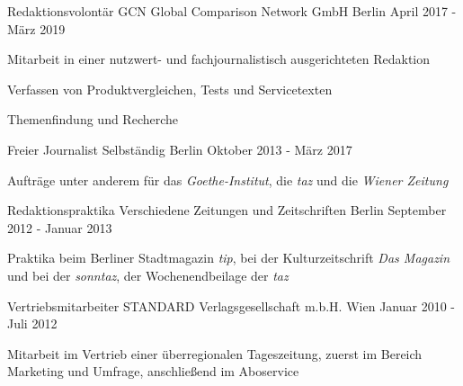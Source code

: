 \begin{cventries}
  \cventry
    {Redaktionsvolontär} %
    {GCN Global Comparison Network GmbH} %
    {Berlin} %
    {April 2017 - März 2019} %
    {
      \begin{cvitems} %
        \item {Mitarbeit in einer nutzwert- und fachjournalistisch ausgerichteten Redaktion}
        \item {Verfassen von Produktvergleichen, Tests und Servicetexten}
        \item {Themenfindung und Recherche}
       \end{cvitems}
    }

  \cventry
    {Freier Journalist} %
    {Selbständig} %
    {Berlin} %
    {Oktober 2013 - März 2017} %
    {
      \begin{cvitems} %
        \item {Aufträge unter anderem für das \emph{Goethe-Institut}, die \emph{taz} und die \emph{Wiener Zeitung}}
       \end{cvitems}
    }

 \cventry
    {Redaktionspraktika} %
    {Verschiedene Zeitungen und Zeitschriften} %
    {Berlin} %
    {September 2012 - Januar 2013} %
    { 
      \begin{cvitems} %
        \item {Praktika beim Berliner Stadtmagazin \emph{tip}, bei der Kulturzeitschrift \emph{Das Magazin} und bei der \emph{sonntaz}, der Wochenendbeilage der \emph{taz}}
      \end{cvitems}
    }

  \cventry
    {Vertriebsmitarbeiter} %
    {STANDARD Verlagsgesellschaft m.b.H.} %
    {Wien} %
    {Januar 2010 - Juli 2012} %
    {
      \begin{cvitems} %
        \item {Mitarbeit im Vertrieb einer überregionalen Tageszeitung, zuerst im Bereich Marketing und Umfrage, anschließend im Aboservice}
      \end{cvitems}
    }

\end{cventries}
